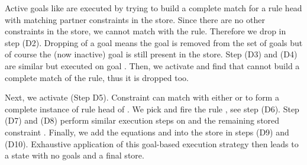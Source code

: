 \documentclass{tlp}
\begin{document}
Active goals like  are executed by trying to build a complete
match for a rule head with matching partner constraints in the store.
Since there are no other constraints in the store, we cannot match
 with the  rule. Therefore we drop  
in step (D2). Dropping of a goal means the goal is removed from the set 
of goals but of course the (now inactive) goal is still present in 
the store.  Step (D3) and (D4) are similar but executed on  goal .
Then, we activate  and find that  cannot
build a complete match of the  rule, thus it is dropped too.

Next, we activate  (Step D5). Constraint  can match with
either  or  to form a complete instance of rule head 
of . We pick  and fire the rule , see step (D6). 
Step (D7) and (D8) perform similar execution steps on  and the remaining
stored constraint . Finally, we add the equations
 and  into the store in steps (D9) and (D10). Exhaustive
application of this goal-based execution strategy then leads to a
state with no goals and a final store.
\end{document}
